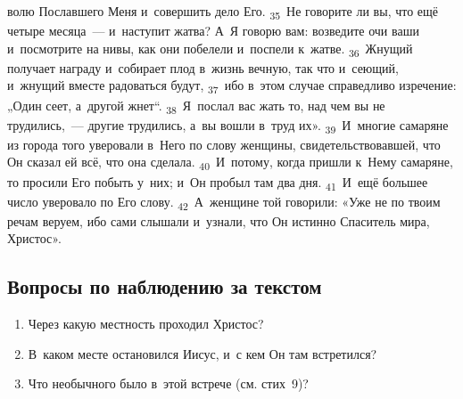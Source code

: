 \documentclass[a4paper,12pt]{article}
\begin{document}
волю Пославшего Меня и~совершить дело Его. \textsubscript{35}~Не говорите ли вы, что ещё четыре месяца~--- и~наступит жатва? А~Я говорю вам: возведите очи ваши и~посмотрите на нивы, как они побелели и~поспели к~жатве. \textsubscript{36}~Жнущий получает награду и~собирает плод в~жизнь вечную, так что и~сеющий, и~жнущий вместе радоваться будут, \textsubscript{37}~ибо в~этом случае справедливо изречение: „Один сеет, а~другой жнет“. \textsubscript{38}~Я~послал вас жать то, над чем вы не трудились,~--- другие трудились, а~вы вошли в~труд их». \textsubscript{39}~И~многие самаряне из города того уверовали в~Него по слову женщины, свидетельствовавшей, что Он сказал ей всё, что она сделала. \textsubscript{40}~И~потому, когда пришли к~Нему самаряне, то просили Его побыть у~них; и~Он пробыл там два дня. \textsubscript{41}~И~ещё большее число уверовало по Его слову. \textsubscript{42}~А~женщине той говорили: «Уже не по твоим речам веруем, ибо сами слышали и~узнали, что Он истинно Спаситель мира, Христос». 


\subsection*{Вопросы по наблюдению за текстом}
\begin{enumerate}
    \item Через какую местность проходил Христос? 
    
    \myline
    
    \item В~каком месте остановился Иисус, и~с кем Он там встретился? 
    
    \myline
    
    \myline
    \item Что необычного было в~этой встрече (см. стих~9)? 
    
    \myline
    
    \myline
\end{enumerate}
\end{document}
